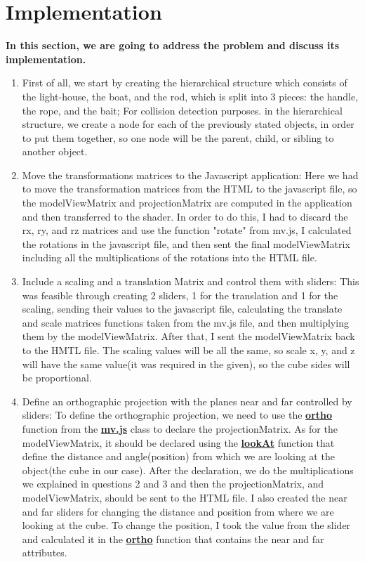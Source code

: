 \documentclass[10pt]{article}
\begin{document}
\section {Implementation}
\textbf{In this section, we are going to address the problem and discuss its implementation.}
\begin{enumerate}
\item First of all, we start by creating the hierarchical structure which consists of the light-house, the boat, and the rod, which is split into 3 pieces: the handle, the rope, and the bait; For collision detection purposes. in the hierarchical structure, we create a node for each of the previously stated objects, in order to put them together, so one node will be the parent, child, or sibling to another object.
\item Move the transformations matrices to the Javascript application:
Here we had to move the transformation matrices from the HTML to the javascript file, so the modelViewMatrix and projectionMatrix are computed in the application and then transferred to the 
shader. In order to do this, I had to discard the rx, ry, and rz matrices and use the function "rotate" from mv.js, I calculated the rotations in the javascript file, and then sent the final modelViewMatrix including all the multiplications of the rotations into the HTML file.
\item Include a scaling and a translation Matrix and control them with sliders:
This was feasible through creating 2 sliders, 1 for the translation and 1 for the scaling, sending their values to the javascript file, calculating the translate and scale matrices functions taken from the mv.js file, and then multiplying them by the modelViewMatrix. After that, I sent the modelViewMatrix back to the HMTL file. The scaling values will be all the same, so scale x, y, and z will have the same value(it was required in the given), so the cube sides will be proportional.
\item Define an orthographic projection with the planes near and far controlled by sliders:
To define the orthographic projection, we need to use the \textbf{\underline {ortho}} function from the \textbf{\underline{mv.js}} class to declare the projectionMatrix. As for the modelViewMatrix, it should be declared using the \textbf{\underline {lookAt}} function that define the distance and angle(position) from which we are looking at the object(the cube in our case). After the declaration, we do the multiplications we explained in questions 2 and 3 and then the projectionMatrix, and modelViewMatrix, should be sent to the HTML file. I also created the near and far sliders for changing the distance and position from where we are looking at the cube. To change the position, I took the value from the slider and calculated it in the \textbf{\underline {ortho}} function that contains the near and far attributes.

\end{enumerate}
\end{document}
